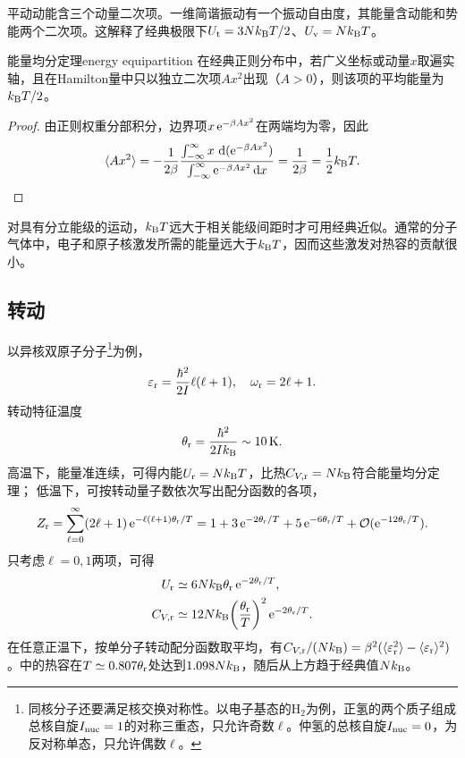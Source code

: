 平动动能含三个动量二次项。一维简谐振动有一个振动自由度，其能量含动能和势能两个二次项。这解释了经典极限下$U_\mathrm t = 3Nk_{\mathrm{B}} T/2$、$U_\mathrm v = Nk_{\mathrm{B}} T$。

\begin{theorem}{能量均分定理}{energy equipartition}
	在经典正则分布中，若广义坐标或动量$x$取遍实轴，且在Hamilton量中只以独立二次项$Ax^2$出现（$A > 0$），则该项的平均能量为$k_{\mathrm{B}} T/2$。
\end{theorem}

\begin{proof}
	由正则权重分部积分，边界项$x\mathop{}\!\mathrm{e}^{-\beta Ax^2}$在两端均为零，因此
	\[
		\langle Ax^2\rangle = -\frac{1}{2\beta}
		\frac{\int_{-\infty}^\infty x\,\mathop{}\!\mathrm{d}(\mathop{}\!\mathrm{e}^{-\beta Ax^2})}{\int_{-\infty}^\infty\mathop{}\!\mathrm{e}^{-\beta Ax^2}\mathop{}\!\mathrm{d} x}
		= \frac1{2\beta} = \frac12k_{\mathrm{B}} T.\qedhere
	\]
\end{proof}

\begin{remark}
	对具有分立能级的运动，$k_{\mathrm{B}} T$远大于相关能级间距时才可用经典近似。通常的分子气体中，电子和原子核激发所需的能量远大于$k_{\mathrm{B}} T$，因而这些激发对热容的贡献很小。
\end{remark}

\subsection{转动}
\label{ssec:rotation}

以异核双原子分子\footnote{同核分子还要满足核交换对称性。以电子基态的$\mathrm H_2$为例，正氢的两个质子组成总核自旋$I_{\rm nuc} = 1$的对称三重态，只允许奇数$\ell$。仲氢的总核自旋$I_{\rm nuc} = 0$，为反对称单态，只允许偶数$\ell$。}为例，
\begin{equation}
	\label{eq:sm-rotor-spectrum}
	\varepsilon_\mathrm r = \frac{\hbar^2}{2I}\ell(\ell + 1),\quad\omega_\mathrm r = 2\ell + 1.
\end{equation}
转动特征温度
\begin{equation}
	\label{eq:sm-rotational-temperature}
	\theta_\mathrm r = \frac{\hbar^2}{2Ik_{\mathrm{B}}} \sim \qty{10}{\kelvin}.
\end{equation}
高温下，能量准连续，可得内能$U_\mathrm r = Nk_{\mathrm{B}} T$，比热$C_{V,\mathrm r} = Nk_{\mathrm{B}}$符合能量均分定理；
低温下，可按转动量子数依次写出配分函数的各项，
\begin{equation}
	\label{eq:sm-rotor-partition}
	Z_\mathrm r = \sum_{\ell=0}^\infty(2\ell + 1)\mathop{}\!\mathrm{e}^{-\ell(\ell+1)\theta_\mathrm r/T} = 1 + 3\mathop{}\!\mathrm{e}^{-2\theta_\mathrm r/T} + 5\mathop{}\!\mathrm{e}^{-6\theta_\mathrm r/T} + \mathcal{O}(\mathop{}\!\mathrm{e}^{-12\theta_\mathrm r/T}).
\end{equation}
只考虑$\ell = 0,1$两项，可得
\begin{subequations}
	\begin{align}
		U_\mathrm r &\simeq 6Nk_{\mathrm{B}}\theta_\mathrm r\mathop{}\!\mathrm{e}^{-2\theta_\mathrm r/T},\\
		C_{V,\mathrm r} &\simeq 12Nk_{\mathrm{B}}\biggl(\frac{\theta_\mathrm r}T\biggr)^2\mathop{}\!\mathrm{e}^{-2\theta_\mathrm r/T}.
	\end{align}
\end{subequations}
在任意正温下，按单分子转动配分函数取平均，有$C_{V,\mathrm r}/(Nk_{\mathrm{B}}) = \beta^2(\langle\varepsilon_\mathrm r^2\rangle - \langle\varepsilon_\mathrm r\rangle^2)$。中的热容在$T \simeq 0.807\theta_\mathrm r$处达到$1.098Nk_{\mathrm{B}}$，随后从上方趋于经典值$Nk_{\mathrm{B}}$。

